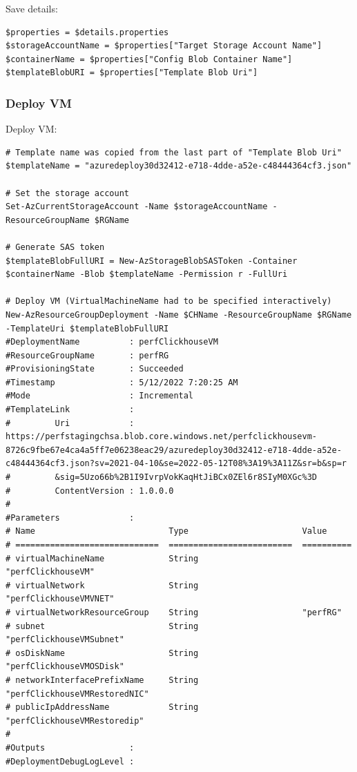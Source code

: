 Save details:
\begin{verbatim}
$properties = $details.properties
$storageAccountName = $properties["Target Storage Account Name"]
$containerName = $properties["Config Blob Container Name"]
$templateBlobURI = $properties["Template Blob Uri"]
\end{verbatim}

\subsubsection{Deploy VM}
\label{sec:orgd09ce0a}
Deploy VM:
\begin{verbatim}
# Template name was copied from the last part of "Template Blob Uri"
$templateName = "azuredeploy30d32412-e718-4dde-a52e-c48444364cf3.json"

# Set the storage account
Set-AzCurrentStorageAccount -Name $storageAccountName -ResourceGroupName $RGName

# Generate SAS token
$templateBlobFullURI = New-AzStorageBlobSASToken -Container $containerName -Blob $templateName -Permission r -FullUri

# Deploy VM (VirtualMachineName had to be specified interactively)
New-AzResourceGroupDeployment -Name $CHName -ResourceGroupName $RGName -TemplateUri $templateBlobFullURI
#DeploymentName          : perfClickhouseVM
#ResourceGroupName       : perfRG
#ProvisioningState       : Succeeded
#Timestamp               : 5/12/2022 7:20:25 AM
#Mode                    : Incremental
#TemplateLink            :
#         Uri            : https://perfstagingchsa.blob.core.windows.net/perfclickhousevm-8726c9fbe67e4ca4a5ff7e06238eac29/azuredeploy30d32412-e718-4dde-a52e-c48444364cf3.json?sv=2021-04-10&se=2022-05-12T08%3A19%3A11Z&sr=b&sp=r
#         &sig=5Uzo66b%2B1I9IvrpVokKaqHtJiBCx0ZEl6r8SIyM0XGc%3D
#         ContentVersion : 1.0.0.0
#
#Parameters              :
# Name                           Type                       Value
# =============================  =========================  ==========
# virtualMachineName             String                     "perfClickhouseVM"
# virtualNetwork                 String                     "perfClickhouseVMVNET"
# virtualNetworkResourceGroup    String                     "perfRG"
# subnet                         String                     "perfClickhouseVMSubnet"
# osDiskName                     String                     "perfClickhouseVMOSDisk"
# networkInterfacePrefixName     String                     "perfClickhouseVMRestoredNIC"
# publicIpAddressName            String                     "perfClickhouseVMRestoredip"
#
#Outputs                 :
#DeploymentDebugLogLevel :
\end{verbatim}

